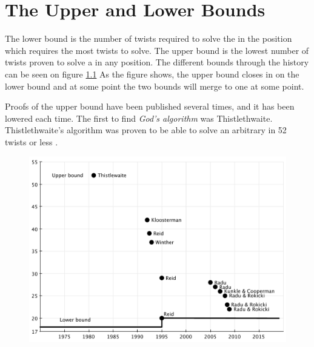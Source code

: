 \chapter{The Upper and Lower Bounds}

The lower bound is the number of twists required to solve the \rubik{} in the position which requires the most twists to solve.
The upper bound is the lowest number of twists proven to solve a \rubik{} in any position.
The different bounds through the history can be seen on figure \ref{fig:upperLowerBound}
As the figure shows, the upper bound closes in on the lower bound and at some point the two bounds will merge to one at some point.

Proofs of the upper bound have been published several times, and it has been lowered each time.
The first to find \textit{God's algorithm} was Thistlethwaite. Thistlethwaite's algorithm was proven to be able to solve an arbitrary \rubik{} in 52 twists or less \cite{jaapthistle}.

\begin{figure}[ht]
	\centering
		\includegraphics[scale = 0.7]{input/pics/bounds2.pdf}
	\caption{}
	\label{fig:upperLowerBound}
\end{figure}




